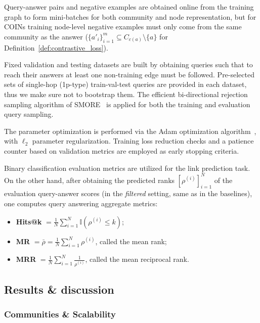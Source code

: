 Query-answer pairs and negative examples are obtained online from the training graph to form mini-batches for both community and node representation, but for COINs training node-level negative examples must only come from the same community as the answer ($\{a'_i\}_{i=1}^m \subseteq C_{c(a)}\setminus\{a\}$ for Definition~\ref{def:contrastive_loss}). 

Fixed validation and testing datasets are built by obtaining queries such that to reach their answers at least one non-training edge must be followed. Pre-selected sets of single-hop (1p-type) train-val-test queries are provided in each dataset, thus we make sure not to bootstrap them. The efficient bi-directional rejection sampling algorithm of SMORE~\cite{ren_smore_2021} is applied for both the training and evaluation query sampling. 

The parameter optimization is performed via the Adam optimization algorithm~\cite{kingma_adam_2015}, with $\ell_2$ parameter regularization. Training loss reduction checks and a patience counter based on validation metrics are employed as early stopping criteria.

Binary classification evaluation metrics are utilized for the link prediction task. On the other hand, after obtaining the predicted ranks $[\rho^{(i)}]_{i=1}^{N}$ of the evaluation query-answer scores (in the \emph{filtered} setting, same as in the baselines), one computes query answering aggregate metrics:
\begin{itemize}
    \item \textbf{Hits@k} $= \frac{1}{N}\sum_{i=1}^{N}{\mathbb{I}(\rho^{(i)} \leq k)}$;
    \item \textbf{MR} $= \bar{\rho} = \frac{1}{N}\sum_{i=1}^{N}{\rho^{(i)}}$, called the mean rank;
    \item \textbf{MRR} $= \frac{1}{N}\sum_{i=1}^{N}{\frac{1}{\rho^{(i)}}}$, called the mean reciprocal rank.
\end{itemize}

%

\subsection{Results \& discussion}
\label{sec:results}

\subsubsection{Communities \& Scalability}

